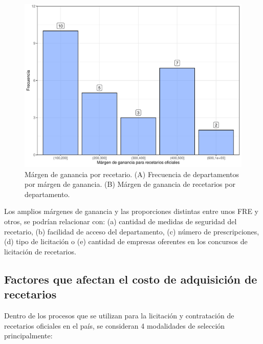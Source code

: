 \documentclass[
  oneside]{book}
\begin{document}
\begin{figure}

{\centering \includegraphics[width=1\linewidth]{InformeFinal_files/figure-latex/comparativoDepartamentos0-1} 

}

\caption{Márgen de ganancia por recetario. (A) Frecuencia de departamentos por márgen de ganancia. (B) Márgen de ganancia de recetarios por departamento.}\label{fig:comparativoDepartamentos0}
\end{figure}

Los amplios márgenes de ganancia y las proporciones distintas entre unos FRE y otros, se podrían relacionar con: (a) cantidad de medidas de seguridad del recetario, (b) facilidad de acceso del departamento, (c) número de prescripciones, (d) tipo de licitación o (e) cantidad de empresas oferentes en los concursos de licitación de recetarios.

\hypertarget{factores-que-afectan-el-costo-de-adquisiciuxf3n-de-recetarios}{%
\subsection{Factores que afectan el costo de adquisición de recetarios}\label{factores-que-afectan-el-costo-de-adquisiciuxf3n-de-recetarios}}

Dentro de los procesos que se utilizan para la licitación y contratación de recetarios oficiales en el país, se consideran 4 modalidades de selección principalmente:
\end{document}
